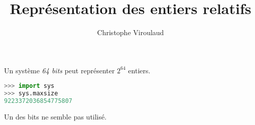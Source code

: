 \documentclass[svgnames,11pt]{beamer}
\author[]{Christophe Viroulaud}
\title{Représentation des entiers relatifs}
\date{\framebox{\textbf{DonRep 02}}}
\institute{Première - NSI}
\begin{document}
\begin{frame}
    \titlepage
\end{frame}
\begin{frame}[fragile]
    \frametitle{}

    Un système \emph{64 bits} peut représenter $2^{64}$ entiers.
    \begin{center}
        \begin{lstlisting}[language=Python , basicstyle=\ttfamily\small, xleftmargin=2em, xrightmargin=2em]
>>> import sys
>>> sys.maxsize 
9223372036854775807
\end{lstlisting}
        \label{CODE}
    \end{center}
    \begin{aretenir}[Observation]
        Un des bits ne semble pas utilisé.
    \end{aretenir}
\end{frame}
\begin{frame}
    \frametitle{}

    \begin{center}
    \end{center}

\end{frame}
\end{document}
